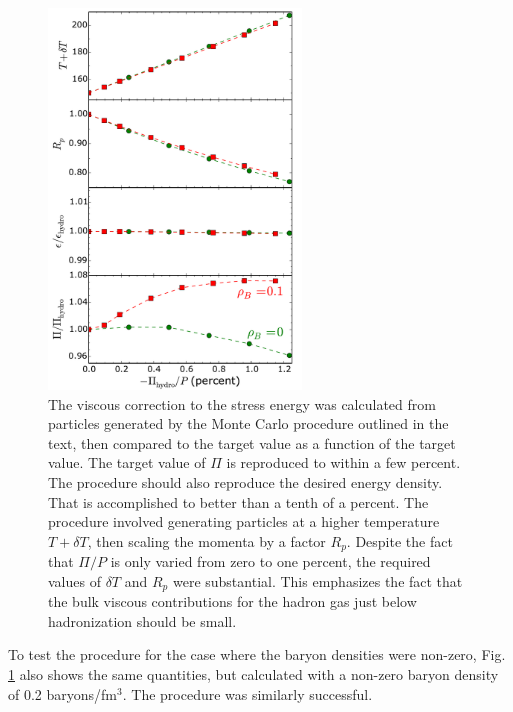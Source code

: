 \begin{figure}
\centerline{\includegraphics[width=0.6\textwidth]{figs/bulk}}
\caption{\label{fig:bulktest}
The viscous correction to the stress energy was calculated from particles generated by the Monte Carlo procedure outlined in the text, then compared to the target value as a function of the target value. The target value of $\Pi$ is reproduced to within a few percent. The procedure should also reproduce the desired energy density. That is accomplished to better than a tenth of a percent. The procedure involved generating particles at a higher temperature $T+\delta T$, then scaling the momenta by a factor $R_p$. Despite the fact that $\Pi/P$ is only varied from zero to one percent, the required values of $\delta T$ and $R_p$ were substantial. This emphasizes the fact that the bulk viscous contributions for the hadron gas just below hadronization should be small.
}
\end{figure}
To test the procedure for the case where the baryon densities were non-zero, Fig. \ref{fig:bulktest} also shows the same quantities, but calculated with a non-zero baryon density of 0.2 baryons/fm$^3$. The procedure was similarly successful.

